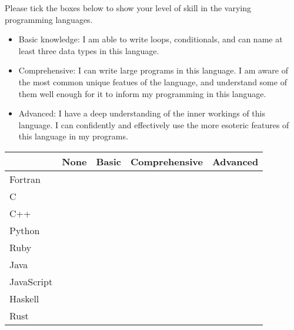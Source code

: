 %
%
Please tick the boxes below to show your level of skill in the varying programming languages.

\begin{itemize}
  \item Basic knowledge: I am able to write loops, conditionals, and can name at least three data types in this language.
  \item {Comprehensive:} I can write large programs in this language. I am aware of the most common unique featues of the language, and understand some of them well enough for it to inform my programming in this language.
  \item {Advanced:} I have a deep understanding of the inner workings of this language. I can confidently and effectively use the more esoteric features of this language in my programs.

\end{itemize}

\begin{center}
\begin{tabular}{|l|c|c|c|c|}
\hline
& None & Basic & Comprehensive & Advanced \\ \hline
Fortran & & & & \\ \hline
C & & & & \\ \hline
C++ & & & & \\ \hline
Python & & & & \\ \hline
Ruby & & & & \\ \hline
Java & & & & \\ \hline
JavaScript & & & & \\ \hline
Haskell & & & & \\ \hline
Rust  & & & & \\ \hline
\end{tabular}
\end{center}

